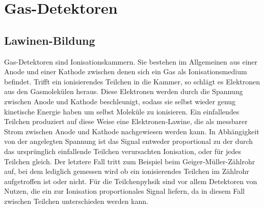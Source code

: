 \section{Gas-Detektoren}
\subsection{Lawinen-Bildung}
Gas-Detektoren sind Ionisationskammern. Sie bestehen im Allgemeinen aus einer Anode und einer Kathode zwischen denen sich ein Gas als Ionisationsmedium befindet. Trifft ein ionisierendes Teilchen in die Kammer, so schlägt es Elektronen aus den Gasmolekülen heraus. Diese Elektronen werden durch die Spannung zwischen Anode und Kathode beschleunigt, sodass sie selbst wieder genug kinetische Energie haben um selbst Moleküle zu ionisieren. Ein einfallendes Teilchen produziert auf diese Weise eine Elektronen-Lawine, die als messbarer Strom zwischen Anode und Kathode nachgewiesen werden kann. In Abhängigkeit von der angelegten Spannung ist das Signal entweder proportional zu der durch das ursprünglich einfallende Teilchen verursachten Ionisation, oder für jedes Teilchen gleich. Der letztere Fall tritt zum Beispiel beim Geiger-Müller-Zählrohr auf, bei dem lediglich gemessen wird ob ein ionisierendes Teilchen im Zählrohr aufgetroffen ist oder nicht. Für die Teilchenpyhsik sind vor allem Detektoren von Nutzen, die ein zur Ionisation proportionales Signal liefern, da in diesem Fall zwischen Teilchen unterschieden werden kann.
